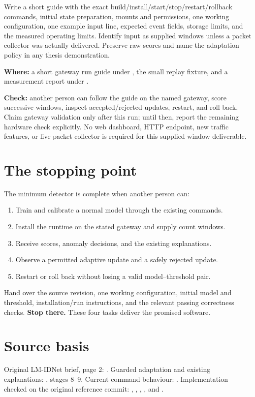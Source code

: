 \documentclass[11pt,a4paper]{article}
\begin{document}
Write a short guide with the exact build/install/start/stop/restart/rollback
commands, initial state preparation, mounts and permissions, one working
configuration, one example input line, expected event fields, storage limits,
and the measured operating limits. Identify input as supplied windows unless a
packet collector was actually delivered. Preserve raw scores and name the
adaptation policy in any thesis demonstration.

\textbf{Where:} a short gateway run guide under , the small replay
fixture, and a measurement report under .

\textbf{Check:} another person can follow the guide on the named gateway, score
successive windows, inspect accepted/rejected updates, restart, and roll back.
Claim gateway validation only after this run; until then, report the remaining
hardware check explicitly. No web dashboard, HTTP endpoint, new traffic features,
or live packet collector is required for this supplied-window deliverable.

\clearpage
\section{The stopping point}

The minimum detector is complete when another person can:
\begin{enumerate}
  \item Train and calibrate a normal model through the existing commands.
  \item Install the runtime on the stated gateway and supply count windows.
  \item Receive scores, anomaly decisions, and the existing explanations.
  \item Observe a permitted adaptive update and a safely rejected update.
  \item Restart or roll back without losing a valid model--threshold pair.
\end{enumerate}
Hand over the source revision, one working configuration, initial model and
threshold, installation/run instructions, and the relevant passing correctness
checks. \textbf{Stop there.} These four tasks deliver the promised software.

\section*{Source basis}

\small
Original LM-IDNet brief, page 2:
.
Guarded adaptation and existing explanations:
, stages 8--9.
Current command behaviour: .
Implementation checked on the original reference commit:
, ,
,
, and
.
\end{document}
